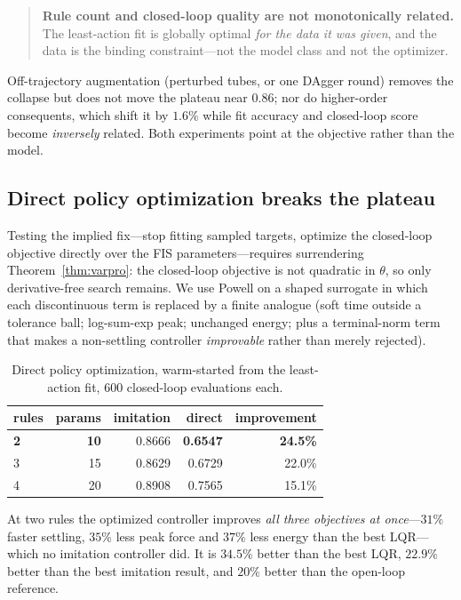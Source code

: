 \documentclass[11pt]{article}
\theoremstyle{plain}
\theoremstyle{definition}
\begin{document}
\begin{quote}
\textbf{Rule count and closed-loop quality are not monotonically related.} The
least-action fit is globally optimal \emph{for the data it was given}, and the
data is the binding constraint---not the model class and not the optimizer.
\end{quote}

Off-trajectory augmentation (perturbed tubes, or one DAgger round) removes the
collapse but does not move the plateau near $0.86$; nor do higher-order
consequents, which shift it by $1.6\%$ while fit accuracy and closed-loop score
become \emph{inversely} related. Both experiments point at the objective rather
than the model.

\subsection{Direct policy optimization breaks the plateau}

Testing the implied fix---stop fitting sampled targets, optimize the closed-loop
objective directly over the FIS parameters---requires surrendering
Theorem~\ref{thm:varpro}: the closed-loop objective is not quadratic in
$\theta$, so only derivative-free search remains. We use Powell on a shaped
surrogate in which each discontinuous term is replaced by a finite analogue
(soft time outside a tolerance ball; log-sum-exp peak; unchanged energy; plus a
terminal-norm term that makes a non-settling controller \emph{improvable}
rather than merely rejected).

\begin{table}[t]
\centering
\caption{Direct policy optimization, warm-started from the least-action fit,
$600$ closed-loop evaluations each.}
\label{tab:policyopt}
\begin{tabular}{lrrrr}
\toprule
rules & params & imitation & direct & improvement \\
\midrule
\textbf{2} & \textbf{10} & 0.8666 & \textbf{0.6547} & \textbf{24.5\%} \\
3 & 15 & 0.8629 & 0.6729 & 22.0\% \\
4 & 20 & 0.8908 & 0.7565 & 15.1\% \\
\bottomrule
\end{tabular}
\end{table}

At two rules the optimized controller improves \emph{all three objectives at
once}---$31\%$ faster settling, $35\%$ less peak force and $37\%$ less energy
than the best LQR---which no imitation controller did. It is $34.5\%$ better
than the best LQR, $22.9\%$ better than the best imitation result, and $20\%$
better than the open-loop reference.
\end{document}
